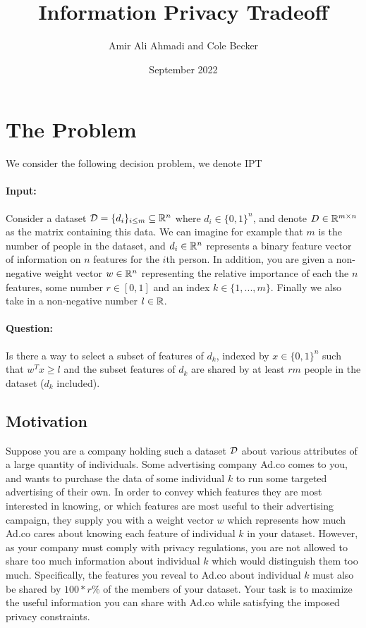 \documentclass[12pt]{article}
\begin{document}
\title{Information Privacy Tradeoff}
\author{Amir Ali Ahmadi and Cole Becker}
\date{September 2022}
\maketitle

\section{The Problem}
We consider the following decision problem, we denote \gls{IPT}
\paragraph{Input:}
Consider a dataset $\mathcal{D} = \{d_i\}_{i\leq m} \subseteq \mathbb{R}^n$ where $d_i \in \{0,1\}^n$, and denote $D\in \mathbb{R}^{m\times n}$ as the matrix containing this data. We can imagine for example that $m$ is the number of people in the dataset, and $d_i\in \mathbb{R}^n$ represents a binary feature vector of information on $n$ features for the $i$th person. In addition, you are given a non-negative weight vector $w\in \mathbb{R}^n$ representing the relative importance of each the $n$ features, some number $r \in [0,1]$ and an index $k \in \{1,...,m\}$. Finally we also take in a non-negative number $l \in \mathbb{R}$.
\paragraph{Question:}
Is there a way to select a subset of features of $d_k$, indexed by $x\in \{0,1\}^n$ such that $w^T x \geq l$ and the subset features of $d_k$ are shared by at least $rm$ people in the dataset ($d_k$ included).
\subsection{Motivation}
Suppose you are a company holding such a dataset $\mathcal{D}$ about various attributes of a large quantity of individuals. Some advertising company Ad.co comes to you, and wants to purchase the data of some individual $k$ to run some targeted advertising of their own. In order to convey which features they are most interested in knowing, or which features are most useful to their advertising campaign, they supply you with a weight vector $w$ which represents how much Ad.co cares about knowing each feature of individual $k$ in your dataset. However, as your company must comply with privacy regulations, you are not allowed to share too much information about individual $k$ which would distinguish them too much. Specifically, the features you reveal to Ad.co about individual $k$ must also be shared by $100 * r\%$ of the members of your dataset. Your task is to maximize the useful information you can share with Ad.co while satisfying the imposed privacy constraints.
\end{document}
